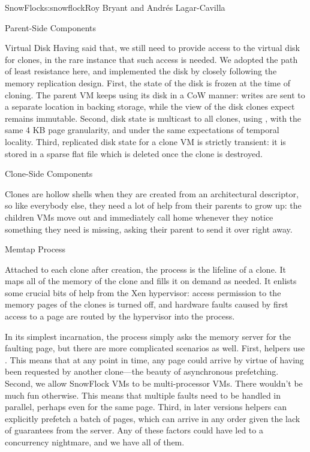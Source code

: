 \begin{aosachapter}{SnowFlock}{s:snowflock}{Roy Bryant and Andr\'e{s} Lagar-Cavilla}
\begin{aosasect1}{Parent-Side Components}
\begin{aosasect2}{Virtual Disk}
Having said that, we still need to provide access to the virtual disk
for clones, in the rare instance that such access is needed. We
adopted the path of least resistance here, and implemented the disk by
closely following the memory replication design. First, the state of
the disk is frozen at the time of cloning. The parent VM keeps using
its disk in a CoW manner: writes are sent to a separate location in
backing storage, while the view of the disk clones expect remains
immutable.  Second, disk state is multicast to all clones, using
, with the same 4 KB page granularity, and under the same
expectations of temporal locality. Third, replicated disk state for a
clone VM is strictly transient: it is stored in a sparse flat file
which is deleted once the clone is destroyed.

\end{aosasect2}

\end{aosasect1}

\begin{aosasect1}{Clone-Side Components}

Clones are hollow shells when they are created from an architectural
descriptor, so like everybody else, they need a lot of help from their
parents to grow up: the children VMs move out and immediately call
home whenever they notice something they need is missing, asking their
parent to send it over right away.

\begin{aosasect2}{Memtap Process}

Attached to each clone after creation, the  process is the
lifeline of a clone. It maps all of the memory of the clone and fills
it on demand as needed.  It enlists some crucial bits of help from the
Xen hypervisor: access permission to the memory pages of the clones is
turned off, and hardware faults caused by first access to a page are
routed by the hypervisor into the  process.

In its simplest incarnation, the  process simply asks the
memory server for the faulting page, but there are more complicated
scenarios as well.  First,  helpers use . This means that at any
point in time, any page could arrive by virtue of having been
requested by another clone---the beauty of asynchronous
prefetching. Second, we allow SnowFlock VMs to be multi-processor VMs.
There wouldn't be much fun otherwise. This means that multiple faults
need to be handled in parallel, perhaps even for the same page.
Third, in later versions  helpers can explicitly prefetch a
batch of pages, which can arrive in any order given the lack of
guarantees from the  server.  Any of these factors could have led
to a concurrency nightmare, and we have all of them.


\end{aosasect2}
\end{aosasect1}
\end{aosachapter}
